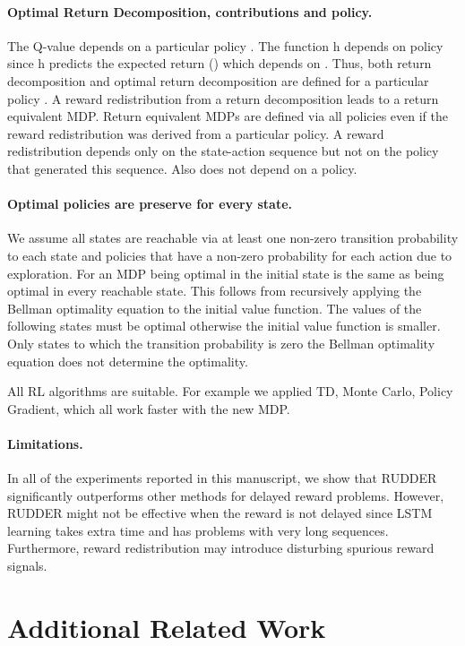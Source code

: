 \documentclass{article}
\begin{document}
\begin{appendices}
\paragraph{Optimal Return Decomposition, contributions and policy.} The Q-value  depends on a particular policy . 
The function h depends on policy  since 
h predicts the expected return () 
which depends on . 
Thus, both return decomposition and optimal return decomposition 
are defined for a particular policy . 
A reward redistribution from a return decomposition 
leads to a return equivalent MDP. 
Return equivalent MDPs are defined via all policies 
even if the reward redistribution was derived from a particular policy. 
A reward redistribution depends only on the state-action sequence 
but not on the policy that generated this sequence. 
Also  does not depend on a policy.


\paragraph{Optimal policies are preserve for every state.}
We assume all states are reachable via at least one non-zero transition probability 
to each state and policies that have a non-zero probability 
for each action due to exploration. 
For an MDP being optimal in the initial state 
is the same as being optimal in every reachable state. 
This follows from recursively applying the Bellman optimality equation 
to the initial value function. 
The values of the following states must be optimal 
otherwise the initial value function is smaller. 
Only states to which the transition probability is zero 
the Bellman optimality equation does not determine the optimality.

All RL algorithms are suitable. 
For example we applied TD, Monte Carlo, Policy Gradient, 
which all work faster with the new MDP.

\paragraph{Limitations.}
In all of the experiments reported in this manuscript, we show that RUDDER significantly outperforms other methods for delayed reward problems. However, RUDDER might not be effective when the reward is not delayed since LSTM learning takes extra time and has problems with very long sequences. Furthermore, reward redistribution may introduce disturbing spurious reward signals.


\clearpage
\pagebreak
\section{Additional Related Work}


\end{appendices}
\end{document}
